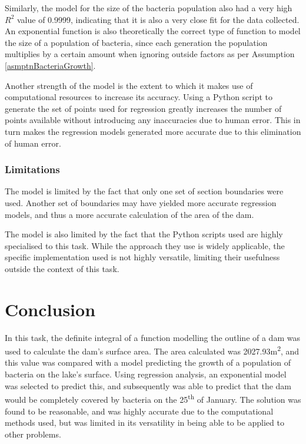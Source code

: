 \documentclass[a4paper]{article}
\theoremstyle{definition}
\begin{document}
            Similarly, the model for the size of the bacteria population also had a very high $R^2$ value of 0.9999, indicating that it is also a very close fit for the data collected. An exponential function is also theoretically the correct type of function to model the size of a population of bacteria, since each generation the population multiplies by a certain amount when ignoring outside factors as per Assumption \ref{asmptnBacteriaGrowth}.

            Another strength of the model is the extent to which it makes use of computational resources to increase its accuracy. Using a Python script to generate the set of points used for regression greatly increases the number of points available without introducing any inaccuracies due to human error. This in turn makes the regression models generated more accurate due to this elimination of human error. 


        \subsubsection{Limitations}
            The model is limited by the fact that only one set of section boundaries were used. Another set of boundaries may have yielded more accurate regression models, and thus a more accurate calculation of the area of the dam. 

            The model is also limited by the fact that the Python scripts used are highly specialised to this task. While the approach they use is widely applicable, the specific implementation used is not highly versatile, limiting their usefulness outside the context of this task.

\section{Conclusion}
In this task, the definite integral of a function modelling the outline of a dam was used to calculate the dam's surface area. The area calculated was 2027.93m\textsuperscript{2}, and this value was compared with a model predicting the growth of a population of bacteria on the lake's surface. Using regression analysis, an exponential model was selected to predict this, and subsequently was able to predict that the dam would be completely covered by bacteria on the 25\textsuperscript{th} of January. The solution was found to be reasonable, and was highly accurate due to the computational methods used, but was limited in its versatility in being able to be applied to other problems.
\end{document}
